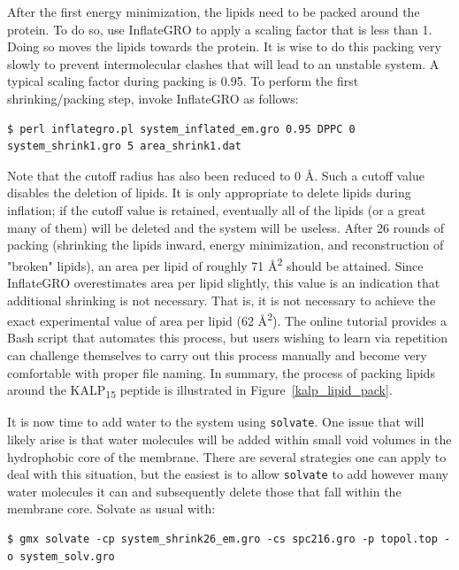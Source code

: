 \documentclass[9pt,tutorial,pubversion]{livecoms}
\begin{document}
After the first energy minimization, the lipids need to be packed around the protein. To do so, use InflateGRO to apply a scaling factor that is less than 1. Doing so moves the lipids towards the protein. It is wise to do this packing very slowly to prevent intermolecular clashes that will lead to an unstable system. A typical scaling factor during packing is 0.95. To perform the first shrinking/packing step, invoke InflateGRO as follows:

\begin{lstlisting}
$ perl inflategro.pl system_inflated_em.gro 0.95 DPPC 0 system_shrink1.gro 5 area_shrink1.dat
\end{lstlisting}
%
Note that the cutoff radius has also been reduced to 0 \AA. Such a cutoff value disables the deletion of lipids. It is only appropriate to delete lipids during inflation; if the cutoff value is retained, eventually all of the lipids (or a great many of them) will be deleted and the system will be useless. After 26 rounds of packing (shrinking the lipids inward, energy minimization, and reconstruction of "broken" lipids), an area per lipid of roughly 71 \AA\textsuperscript{2} should be attained. Since InflateGRO overestimates area per lipid slightly, this value is an indication that additional shrinking is not necessary. That is, it is not necessary to achieve the exact experimental value of area per lipid (62 \AA\textsuperscript{2}). The online tutorial provides a Bash script that automates this process, but users wishing to learn via repetition can challenge themselves to carry out this process manually and become very comfortable with proper file naming. In summary, the process of packing lipids around the KALP\textsubscript{15} peptide is illustrated in Figure~\ref{kalp_lipid_pack}.

It is now time to add water to the system using \texttt{solvate}. One issue that will likely arise is that water molecules will be added within small void volumes in the hydrophobic core of the membrane. There are several strategies one can apply to deal with this situation, but the easiest is to allow \texttt{solvate} to add however many water molecules it can and subsequently delete those that fall within the membrane core. Solvate as usual with:

\begin{lstlisting}
$ gmx solvate -cp system_shrink26_em.gro -cs spc216.gro -p topol.top -o system_solv.gro
\end{lstlisting}
\end{document}
